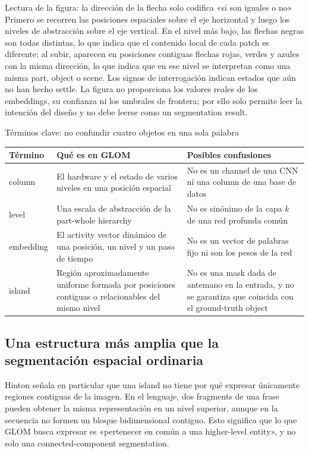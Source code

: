 \documentclass[a4paper]{article}
\begin{document}
\begin{knowledgebox}{Lectura de la figura: la dirección de la flecha solo codifica «si son iguales o no»}
Primero se recorren las posiciones espaciales sobre el eje horizontal y luego los niveles de abstracción sobre el eje vertical. En el nivel más bajo, las flechas negras son todas distintas, lo que indica que el contenido local de cada patch es diferente; al subir, aparecen en posiciones contiguas flechas rojas, verdes y azules con la misma dirección, lo que indica que en ese nivel se interpretan como una misma part, object o scene. Los signos de interrogación indican estados que aún no han hecho settle. La figura no proporciona los valores reales de los embeddings, su confianza ni los umbrales de frontera; por ello solo permite leer la intención del diseño y no debe leerse como un segmentation result.
\end{knowledgebox}

\begin{knowledgebox}{Términos clave: no confundir cuatro objetos en una sola palabra}
\begin{tabularx}{\textwidth}{L{0.21\textwidth}L{0.29\textwidth}X}
\toprule
Término & Qué es en GLOM & Posibles confusiones \\
\midrule
column & El hardware y el estado de varios niveles en una posición espacial & No es un channel de una CNN ni una column de una base de datos \\
level & Una escala de abstracción de la part-whole hierarchy & No es sinónimo de la capa $k$ de una red profunda común \\
embedding & El activity vector dinámico de una posición, un nivel y un paso de tiempo & No es un vector de palabras fijo ni son los pesos de la red \\
island & Región aproximadamente uniforme formada por posiciones contiguas o relacionables del mismo nivel & No es una mask dada de antemano en la entrada, y no se garantiza que coincida con el ground-truth object \\
\bottomrule
\end{tabularx}
\end{knowledgebox}

\subsection{Una estructura más amplia que la segmentación espacial ordinaria}

Hinton señala en particular que una island no tiene por qué expresar únicamente regiones contiguas de la imagen. En el lenguaje, dos fragments de una frase pueden obtener la misma representación en un nivel superior, aunque en la secuencia no formen un bloque bidimensional contiguo. Esto significa que lo que GLOM busca expresar es «pertenecer en común a una higher-level entity», y no solo una connected-component segmentation.
\end{document}
